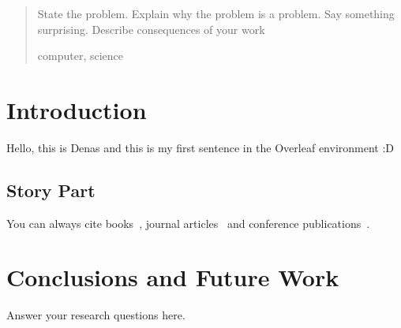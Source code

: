 \documentclass[11pt,fleqn]{report}
\begin{document}
 
\makecoverpage
\tableofcontents
\begin{abstract}      
  State the problem.
  Explain why the problem is a problem.
  Say something surprising.
  Describe consequences of your work

  
  \begin{keywords}    
   computer, science
  \end{keywords}
\end{abstract}


\chapter{Introduction} 
Hello, this is Denas and this is my first sentence in the Overleaf environment :D

\section{Story Part}
You can always cite books~\cite{Grune2012}, journal articles~\cite{Zoo2015} and conference publications~\cite{BabyCobol2020}.

\chapter{Conclusions and Future Work}
Answer your research questions here.



\end{document}
